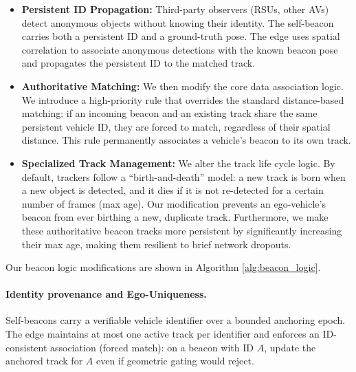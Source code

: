 \begin{itemize}[noitemsep,topsep=0pt,leftmargin=1.1\parindent]

    \item \textbf{Persistent ID Propagation:} Third-party observers (RSUs, other AVs) detect anonymous objects without knowing their identity. The self-beacon carries both a persistent ID and a ground-truth pose. The edge uses spatial correlation to associate anonymous detections with the known beacon pose and propagates the persistent ID to the matched track.

    \item \textbf{Authoritative Matching:} We then modify the core data association logic. We introduce a high-priority rule that overrides the standard distance-based matching: if an incoming beacon and an existing track share the same persistent vehicle ID, they are forced to match, regardless of their spatial distance. This rule permanently associates a vehicle's beacon to its own track.

    \item \textbf{Specialized Track Management:} We alter the track life cycle logic. By default, trackers follow a ``birth-and-death'' model: a new track is born when a new object is detected, and it dies if it is not re-detected for a certain number of frames (max age). Our modification prevents an ego-vehicle's beacon from ever birthing a new, duplicate track. Furthermore, we make these authoritative beacon tracks more persistent by significantly increasing their max age, making them resilient to brief network dropouts.
    
\end{itemize}



Our beacon logic modifications are shown in Algorithm \ref{alg:beacon_logic}. 
\paragraph{Identity provenance and Ego-Uniqueness.}
Self-beacons carry a verifiable vehicle identifier over a bounded anchoring epoch. The edge maintains at most one active track per identifier and enforces an ID-consistent association (forced match): on a beacon with ID \(A\), update the anchored track for \(A\) even if geometric gating would reject.

